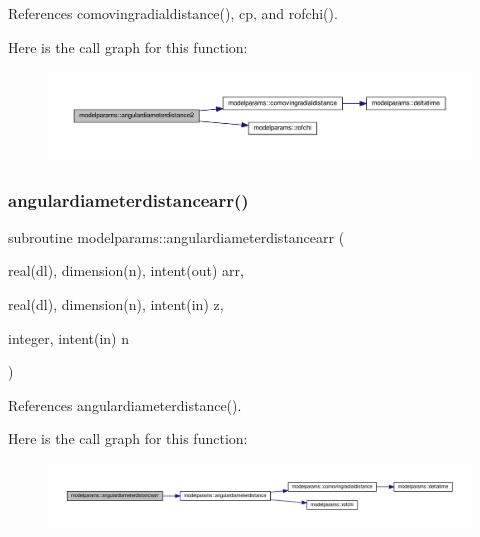 References comovingradialdistance(), cp, and rofchi().

Here is the call graph for this function\+:
\nopagebreak
\begin{figure}[H]
\begin{center}
\leavevmode
\includegraphics[width=350pt]{namespacemodelparams_a74645c7e2e48bb3d57da7da5383799ed_cgraph}
\end{center}
\end{figure}
\mbox{\label{namespacemodelparams_a31cf59c4ca59e0bc5c8c2b45a8f3487e}} 
\subsubsection{\texorpdfstring{angulardiameterdistancearr()}{angulardiameterdistancearr()}}
{\footnotesize\ttfamily subroutine modelparams\+::angulardiameterdistancearr (\begin{DoxyParamCaption}\item[{real(dl), dimension(n), intent(out)}]{arr,  }\item[{real(dl), dimension(n), intent(in)}]{z,  }\item[{integer, intent(in)}]{n }\end{DoxyParamCaption})}



References angulardiameterdistance().

Here is the call graph for this function\+:
\nopagebreak
\begin{figure}[H]
\begin{center}
\leavevmode
\includegraphics[width=350pt]{namespacemodelparams_a31cf59c4ca59e0bc5c8c2b45a8f3487e_cgraph}
\end{center}
\end{figure}
\mbox{\label{namespacemodelparams_a39160c5bd9a51624f48cbef4197bb22f}} 
